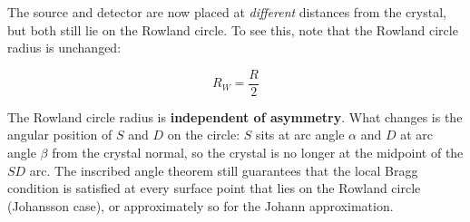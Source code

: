 The source and detector are now placed at \emph{different} distances from the crystal, but
both still lie on the Rowland circle.  To see this, note that the Rowland circle radius is
unchanged:

\begin{keyresult}
\begin{equation}
  R_W = \frac{R}{2}
  \label{eq:rowland_asym}
\end{equation}
\end{keyresult}

The Rowland circle radius is \textbf{independent of asymmetry}.  What changes is the
angular position of $S$ and $D$ on the circle: $S$ sits at arc angle $\alpha$ and $D$ at
arc angle $\beta$ from the crystal normal, so the crystal is no longer at the midpoint of
the $SD$ arc.  The inscribed angle theorem still guarantees that the local Bragg condition
is satisfied at every surface point that lies on the Rowland circle (Johansson case), or
approximately so for the Johann approximation.
